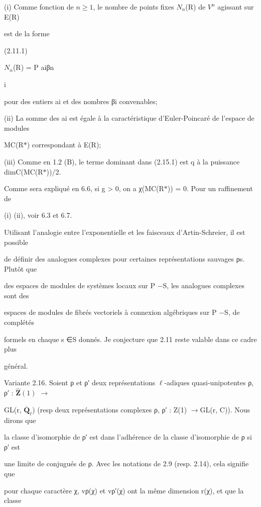 \documentclass[11pt]{article}
\begin{document}
\noindent (i) Comme fonction de \(n\geq 1\), le nombre de points fixes \(N_n\)(R) de \(V^n\) agissant sur E(R)\par
\medskip
\noindent est de la forme\par
\noindent (2.11.1)\par
\noindent \(N_n\)(R) = P aiβn\par
\noindent i\par
\noindent pour des entiers ai et des nombres βi convenables;\par
\noindent (ii) La somme des ai est égale à la caractéristique d’Euler-Poincaré de l’espace de modules\par
\noindent MC(R\(*\)) correspondant à E(R);\par
\noindent (iii) Comme en 1.2 (B), le terme dominant dans (2.15.1) est q à la puissance dimC(MC(R\(*\)))/2.\par
\noindent Comme sera expliqué en 6.6, si g > 0, on a χ(MC(R\(*\))) = 0. Pour un raffinement de\par
{} (i) (ii), voir 6.3 et 6.7.\par
\noindent Utilisant l’analogie entre l’exponentielle et les faisceaux d’Artin-Schreier, il est possible\par
\noindent de définir des analogues complexes pour certaines représentations sauvages ρs. Plutôt que\par
\noindent des espaces de modules de systèmes locaux sur P −S, les analogues complexes sont des\par
\noindent espaces de modules de fibrés vectoriels à connexion algébriques sur P −S, de complétés\par
\noindent formels en chaque s ∈S donnés. Je conjecture que 2.11 reste valable dans ce cadre plus\par
\noindent général.\par
\noindent Variante 2.16. Soient ρ et ρ′ deux représentations \(\ell\)-adiques quasi-unipotentes ρ, ρ′ : \(\widehat{\mathbf Z}(1)\) \(\to\)\par
\noindent GL(r, \(\overline{\mathbf Q}_{\ell}\)) (resp deux représentations complexes ρ, ρ′ : Z(1) \(\to\)GL(r, C)). Nous dirons que\par
\noindent la classe d’isomorphie de ρ′ est dans l’adhérence de la classe d’isomorphie de ρ si ρ′ est\par
\noindent une limite de conjugués de ρ. Avec les notations de 2.9 (resp. 2.14), cela signifie que\par
\noindent pour chaque caractère χ, vρ(χ) et vρ′(χ) ont la même dimension r(χ), et que la classe\par
\end{document}
